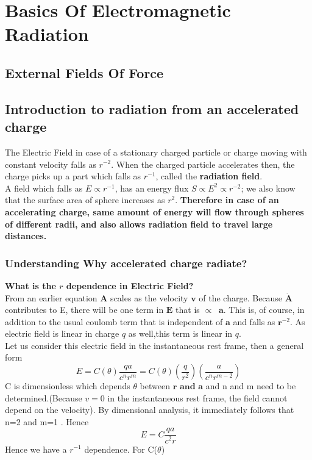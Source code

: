 \documentclass[11pt]{report}
\newcommand{\mbf}[1]{\mathbf{#1}}
\newcommand{\cc}[1]{\left({#1}\right)}
\begin{document}
\section{Basics Of Electromagnetic Radiation}
\subsection{External Fields Of Force}

\subsection{Introduction to radiation from an accelerated charge}
The Electric Field in case of a stationary charged particle or charge moving with constant velocity falls as $r^{-2}$. When the charged particle accelerates then, the charge picks up a part which falls as $r^{-1}$, called the \textbf{radiation field}.\\
A field which falls as $E \propto r^{-1}$, has an energy flux $S \propto E^2 \propto r^{-2}$; we also know that the surface area of sphere increases as $r^2$. \textbf{Therefore in case of an accelerating charge, same amount of energy will flow through spheres of different radii, and also allows radiation field to travel large distances.}
\\
\subsubsection{Understanding Why accelerated charge radiate?}
\textbf{What is the $r$ dependence in Electric Field? }\\
From an earlier equation $\mbf{A}$ scales as the velocity $\mbf{v}$ of the charge. Because $\dot{\mbf{A}}$ contributes to E, there will be one  term in $\mbf{E}$ that is $\propto \; \; \mbf{a}$. This is, of course, in addition to the usual coulomb term that is independent of $\mbf{a}$ and falls as $\mbf{r}^{-2}$. As electric field is linear in charge $q$ as well,this term is linear in $q$. \\

Let us consider this electric field in the instantaneous rest frame, then a general form 
\begin{equation}
E=C(\theta)\frac{qa}{c^nr^m}=C(\theta) \cc{\frac{q}{r^2}}\cc{\frac{a}{c^nr^{m-2}}}
\end{equation}
C is dimensionless which depends $\theta$ between $\mbf{r \text{ and } a}$ and n and m need to be determined.(Because $v=0$ in the instantaneous rest  frame, the field cannot depend on the velocity). By dimensional analysis, it immediately follows that n=2 and m=1 . Hence
\begin{equation}
E=C\frac{qa}{c^2r}
\end{equation}
Hence we have a $r^{-1}$ dependence.
For C($\theta$)
\end{document}
